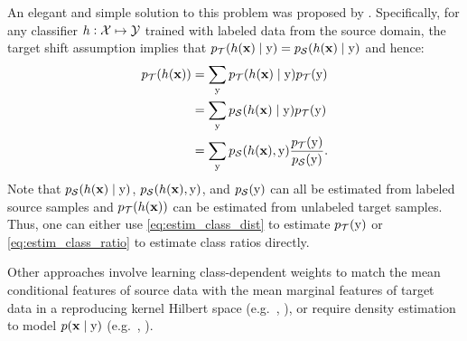 An elegant and simple solution to this problem was proposed by \citet{Lipton2018}. Specifically, for any classifier $h: {\mathcal{X}} \mapsto {\mathcal{Y}}$ trained with labeled data from the source domain, the target shift assumption implies that $p_{{\mathcal{T}}}(h({\mathbf{x}}) \mid {\textnormal{y}}) = p_{{\mathcal{S}}}(h({\mathbf{x}}) \mid {\textnormal{y}})$ and hence:
\begin{align}
p_{\gT}(h(\rvx)) &= \sum_{\ry} p_{\gT}(h(\rvx) \mid \ry) p_{\gT}(\ry) \nonumber\\
\allowdisplaybreaks
&= \sum_{\ry} p_{\gS}(h(\rvx) \mid \ry) p_{\gT}(\ry) \label{eq:estim_class_dist}\\
\allowdisplaybreaks
&= \sum_{\ry} p_{\gS}(h(\rvx), \ry) \frac{p_{\gT}(\ry)}{p_{\gS}(\ry)}. \label{eq:estim_class_ratio}
\end{align}
Note that $p_{{\mathcal{S}}}(h({\mathbf{x}}) \mid {\textnormal{y}})$, $p_{{\mathcal{S}}}(h({\mathbf{x}}), {\textnormal{y}})$, and $p_{{\mathcal{S}}}({\textnormal{y}})$ can all be estimated from labeled source samples and $p_{{\mathcal{T}}}(h({\mathbf{x}}))$ can be estimated from unlabeled target samples. Thus, one can either use \eqref{eq:estim_class_dist} to estimate $p_{{\mathcal{T}}}({\textnormal{y}})$ or \eqref{eq:estim_class_ratio} to estimate class ratios directly.

Other approaches involve learning class-dependent weights to match the mean conditional features of source data with the mean marginal features of target data in a reproducing kernel Hilbert space (e.g.\  \citet{Iyer2004}, \citet{Zhang2013}), or require density estimation to model $p({\mathbf{x}} \mid {\textnormal{y}})$ (e.g.\ \citet{Chan2005}, \citet{Storkey2009}).

